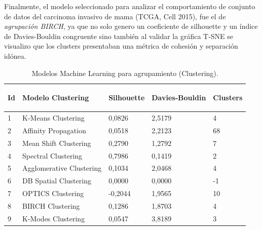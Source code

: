 Finalmente, el modelo seleccionado para analizar el comportamiento de conjunto de datos del carcinoma invasivo de mama (TCGA, Cell 2015), fue el de \textit{agrupación BIRCH}, ya que no solo genero un coeficiente de silhouette y un índice de Davies-Bouldin congruente sino también al validar la gráfica T-SNE se visualizo que los clusters presentaban una métrica de cohesión y separación idónea.

\begin{table} [!htb]
	\footnotesize
	\begin{threeparttable}
		\caption{Modelos Machine Learning para agrupamiento (Clustering).}
		\label{Clustering_Models}
		\begin{tabular}{p{1cm} p{6cm} p{2.5cm} p{2.5cm} p{1.5cm}} \toprule	
			\begin{center}Id\end{center}
			&\begin{center}Modelo Clustering\end{center}
			&\begin{center}Silhouette\end{center}
			&\begin{center}Davies-Bouldin\end{center}
			&\begin{center}Clusters\end{center}
			\\ \hline 1 & K-Means Clustering 	&	0,0826	&	2,5179	&	4
			\\ \hline 2 & Affinity Propagation	&	0,0518	&	2,2123	&	68
			\\ \hline 3 & Mean Shift Clustering 	&	0,2790	&	1,2792	&	7
			\\ \hline 4 & Spectral Clustering	&	0,7986	&	0,1419	&	2
			\\ \hline 5 & Agglomerative Clustering	&	0,1034	&	2,0468	&	4
			\\ \hline 6 & DB Spatial Clustering 	&	0,0000	&	0,0000	&	-1
			\\ \hline 7 & OPTICS Clustering	&	-0,2044	&	1,9565	&	10
			\\ \hline 8 & BIRCH Clustering	&	0,1286	&	1,8703	&	4
			\\ \hline 9 & K-Modes Clustering	&	0,0547	&	3,8189	&	3
			\\ \hline
		\end{tabular}
	\end{threeparttable}
\end{table}

